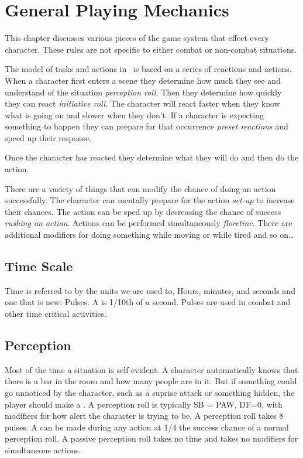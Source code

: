 \chapter{General Playing Mechanics}

This chapter discusses various pieces of the game system that effect 
every character. These rules are not specific to either combat or 
non-combat situations.  

The model of tasks and actions in \SH\ is based on a series of 
reactions and actions. When a character first enters a scene
they determine how much they see and understand of the situation {\em 
perception roll}. Then they determine how quickly they can react {\em 
initiative roll}. The character will react faster when they know what 
is going on and slower when they don't. If a character is expecting 
something to happen they can prepare for that occurrence {\em preset 
reactions} and speed up their response. 

Once the character has reacted they determine what they will do and then 
do the action. 

There are a variety of things that can modify the chance of doing an 
action successfully. The character can mentally prepare for the 
action {\em set-up} to increase their chances. The action can be sped 
up by decreasing the chance of success {\em rushing an action}. 
Actions can be performed simultaneously {\em floretine}. There are 
additional modifiers for doing something while moving or while tired 
and so on\dots

\section{Time Scale}

Time is referred to by the units we are used to, Hours, minutes, and seconds 
and one that is new: Pulses. A  is 1/10th of a second. Pulses are
used in combat and other time critical activities.

\section{Perception}

Most of the time a situation is self evident. A character automatically
knows that there is a bar in the room and how many people are in it.
But if something could go unnoticed by the character, such as a suprise 
attack or something hidden, the player should make a . 
A perception roll is typically SB = PAW, DF=0, with modifiers for 
how alert the character is trying to be. A perception roll takes
8 pulses. A  can be made 
during any action at 1/4 the success chance of a normal perception roll. A
passive perception roll takes no time and takes no modifiers for 
simultaneous actions.

